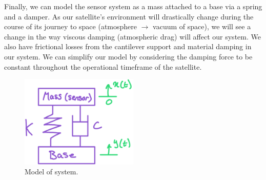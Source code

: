 \documentclass[11pt]{article}
\numberwithin{equation}{section}
\begin{document}
Finally, we can model the sensor system as a mass attached to a base via a spring and a damper. As our satellite's environment will drastically change during the course of its journey to space (atmosphere $\rightarrow$ vacuum of space), we will see a change in the way viscous damping (atmospheric drag) will affect our system. We also have frictional losses from the cantilever support and material damping in our system. We can simplify our model by considering the damping force to be constant throughout the operational timeframe of the satellite.
\begin{figure}[H]
    \centering
    \includegraphics[width = 0.5\textwidth]{./img/q1a3.png}
    \caption{Model of system.}
    \label{q1a3}
\end{figure}
\end{document}
